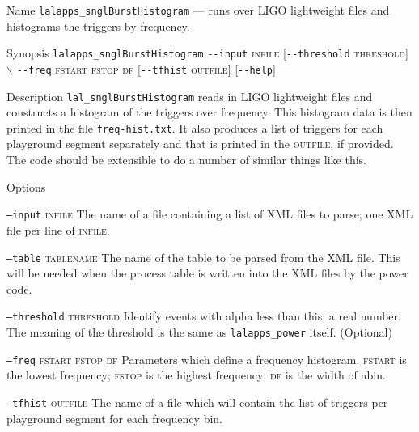 \begin{entry}

\item[Name]
\verb$lalapps_snglBurstHistogram$ --- runs over LIGO lightweight files and histograms
the triggers by frequency.   

\item[Synopsis]
\verb$lalapps_snglBurstHistogram$ \verb$--input$ \textsc{infile} 
[\verb$--threshold$ \textsc{threshold}]    
$\backslash$ \newline \hspace*{0.25in}
\verb$--freq$ \textsc{fstart} \textsc{fstop} \textsc{df}
[\verb$--tfhist$ \textsc{outfile}] 
[\verb$--help$]

\item[Description] 
\verb$lal_snglBurstHistogram$ reads in LIGO lightweight files and
constructs a histogram of the triggers over frequency. This histogram data 
is then printed in the file \verb$freq-hist.txt$. It also produces a list of triggers for each playground segment separately and that is printed in the \textsc{outfile}, if provided.   The code
should be extensible to do a number of similar things like this.

\item[Options]\leavevmode
\begin{entry}
\item[\texttt{--input}  \textsc{infile}] The name of a file containing
a list of XML files to parse;  one XML file per line of
\textsc{infile}.

\item[\texttt{--table} \textsc{tablename}] The name of the table to be
parsed from the XML file.   This will be needed when the process
table is written into the XML files by the power code.

\item[\texttt{--threshold} \textsc{threshold}] Identify events with alpha
less than this; a real number.  The meaning of the threshold is the same as
\verb$lalapps_power$ itself.  (Optional)

\item[\texttt{--freq} \textsc{fstart} \textsc{fstop} \textsc{df}]
Parameters which define a frequency histogram.  \textsc{fstart} is the
lowest frequency;  \textsc{fstop} is the highest frequency; \textsc{df} 
is the width of abin.

\item[\texttt{--tfhist}  \textsc{outfile}] The name of a file which will 
contain the list of triggers per playground segment for each frequency bin.


\end{entry}
\end{entry}
